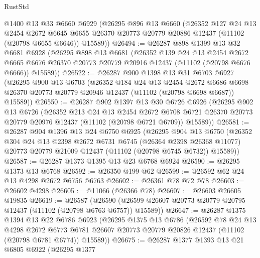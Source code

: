 \begin{lexlean}{RustStd}
\begin{coremodule}
    @1400
    @13
    @33
    @6660
    @6929
    (@26295
      @896
      @13
      @6660
      (@26352
        @127
        @24
        @13
        @2454
        @2672
        @6645
        @6655
        @26370
        @20773
        @20779
        @20886
        @12437
        (@11102 (@20798 @6655 @6646))
        @15589))
@26494 := @26287
    @898
    @1399
    @13
    @32
    @6681
    @6928
    (@26295
      @898
      @13
      @6681
      (@26352
        @139
        @24
        @13
        @2454
        @2672
        @6665
        @6676
        @26370
        @20773
        @20779
        @20916
        @12437
        (@11102 (@20798 @6676 @6666))
        @15589))
@26522 := @26287
    @900
    @1398
    @13
    @31
    @6703
    @6927
    (@26295
      @900
      @13
      @6703
      (@26352
        @184
        @24
        @13
        @2454
        @2672
        @6686
        @6698
        @26370
        @20773
        @20779
        @20946
        @12437
        (@11102 (@20798 @6698 @6687))
        @15589))
@26550 := @26287
    @902
    @1397
    @13
    @30
    @6726
    @6926
    (@26295
      @902
      @13
      @6726
      (@26352
        @213
        @24
        @13
        @2454
        @2672
        @6708
        @6721
        @26370
        @20773
        @20779
        @20976
        @12437
        (@11102 (@20798 @6721 @6709))
        @15589))
@26581 := @26287
    @904
    @1396
    @13
    @24
    @6750
    @6925
    (@26295
      @904
      @13
      @6750
      (@26352
        @304
        @24
        @13
        @2398
        @2672
        @6731
        @6745
        (@26364 @2398 @26368 @11077)
        @20773
        @20779
        @21009
        @12437
        (@11102 (@20798 @6745 @6732))
        @15589))
@26587 := @26287 @1373 @1395 @13 @23 @6768 @6924
@26590 := @26295 @1373 @13 @6768
@26592 := @26350 @199 @62
@26599 := @26592 @62 @24 @13 @4298 @2672 @6756 @6763
@26602 := @26361 @78 @72 @78
@26603 := @26602 @4298
@26605 := @11066 (@26366 @78)
@26607 := @26603 @26605 @19835
@26619 := @26587
    (@26590 (@26599 @26607 @20773 @20779 @20795 @12437 (@11102 (@20798 @6763 @6757)) @15589))
@26647 := @26287
    @1375
    @1394
    @13
    @22
    @6786
    @6923
    (@26295
      @1375
      @13
      @6786
      (@26592
        @78
        @24
        @13
        @4298
        @2672
        @6773
        @6781
        @26607
        @20773
        @20779
        @20826
        @12437
        (@11102 (@20798 @6781 @6774))
        @15589))
@26675 := @26287
    @1377
    @1393
    @13
    @21
    @6805
    @6922
    (@26295
      @1377

\end{coremodule}
\end{lexlean}
